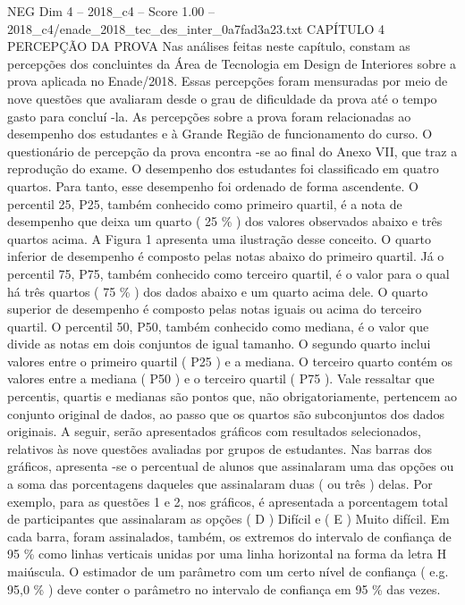 \begin{textsample}{NEG Dim 4 – 2018\_c4 – Score 1.00 – 2018\_c4/enade\_2018\_tec\_des\_inter\_0a7fad3a23.txt}  \label{ex:f4_neg_177}
CAPÍTULO 4 PERCEPÇÃO DA PROVA Nas análises feitas neste capítulo, constam as percepções dos concluintes da Área de Tecnologia em Design de Interiores sobre a prova aplicada no Enade/2018.
Essas percepções foram mensuradas por meio de nove questões que avaliaram desde o grau de dificuldade da prova até o tempo gasto para concluí -la.
As percepções sobre a prova foram relacionadas ao desempenho dos estudantes e à Grande Região de funcionamento do curso.
O questionário de percepção da prova encontra -se ao final do Anexo VII, que traz a reprodução do exame.
O desempenho dos estudantes foi classificado em quatro quartos.
Para tanto, esse desempenho foi ordenado de forma ascendente.
O percentil 25, P25, também conhecido como primeiro quartil, é a nota de desempenho que deixa um quarto ( 25 \% ) dos valores observados abaixo e três quartos acima.
A Figura 1 apresenta uma ilustração desse conceito.
O quarto inferior de desempenho é composto pelas notas abaixo do primeiro quartil.
Já o percentil 75, P75, também conhecido como terceiro quartil, é o valor para o qual há três quartos ( 75 \% ) dos dados abaixo e um quarto acima dele.
O quarto superior de desempenho é composto pelas notas iguais ou acima do terceiro quartil.
O percentil 50, P50, também conhecido como mediana, é o valor que divide as notas em dois conjuntos de igual tamanho.
O segundo quarto inclui valores entre o primeiro quartil ( P25 ) e a mediana.
O terceiro quarto contém os valores entre a mediana ( P50 ) e o terceiro quartil ( P75 ).
Vale ressaltar que percentis, quartis e medianas são pontos que, não obrigatoriamente, pertencem ao conjunto original de dados, ao passo que os quartos são subconjuntos dos dados originais.
A seguir, serão apresentados gráficos com resultados selecionados, relativos às nove questões avaliadas por grupos de estudantes.
Nas barras dos gráficos, apresenta -se o percentual de alunos que assinalaram uma das opções ou a soma das porcentagens daqueles que assinalaram duas ( ou três ) delas.
Por exemplo, para as questões 1 e 2, nos gráficos, é apresentada a porcentagem total de participantes que assinalaram as opções ( D ) Difícil e ( E ) Muito difícil.
Em cada barra, foram assinalados, também, os extremos do intervalo de confiança de 95 \% como linhas verticais unidas por uma linha horizontal na forma da letra H maiúscula.
O estimador de um parâmetro com um certo nível de confiança ( e.g. 95,0 \% ) deve conter o parâmetro no intervalo de confiança em 95 \% das vezes.

\end{textsample}
